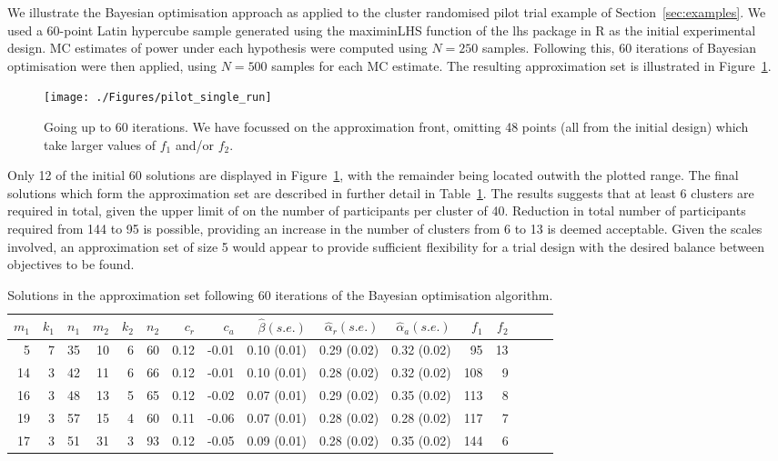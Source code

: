 \documentclass{article} %
\begin{document}
We illustrate the Bayesian optimisation approach as applied to the cluster randomised pilot trial example of  Section~\ref{sec:examples}. We used a 60-point Latin hypercube sample generated using the maximinLHS function of the lhs package in R as the initial experimental design. MC estimates of power under each hypothesis were computed using $N = 250$ samples. Following this, 60 iterations of Bayesian optimisation were then applied, using $N = 500$ samples for each MC estimate. The resulting approximation set is illustrated in Figure~\ref{fig:pilot_single_run}.

\begin{figure}
\centering
\texttt{[image: ./Figures/pilot\_single\_run]}
\caption{Going up to 60 iterations. We have focussed on the approximation front, omitting 48 points (all from the initial design) which take larger values of $f_{1}$ and/or $f_{2}$. }
\label{fig:pilot_single_run}
\end{figure}

Only 12 of the initial 60 solutions are displayed in Figure~\ref{fig:pilot_single_run}, with the remainder being located outwith the plotted range. The final solutions which form the approximation set are described in further detail in Table~\ref{tab:pilot_single_run}. The results suggests that at least 6 clusters are required in total, given the upper limit of on the number of participants per cluster of 40. Reduction in total number of participants required from 144 to 95 is possible, providing an increase in the number of clusters from 6 to 13 is deemed acceptable. Given the scales involved, an approximation set of size 5 would appear to provide sufficient flexibility for a trial design with the desired balance between objectives to be found.

\begin{table}
\centering
\begin{tabular}{rrrrrrrrrrrrrrrr}
\toprule 
$m_{1}$ & $k_{1}$ & $n_{1}$ & $m_{2}$ & $k_{2}$ & $n_{2}$ & $c_{r}$ & $c_{a}$ & $\hat{\beta} (s.e.)$ & $\hat{\alpha}_{r} (s.e.)$ & 
$\hat{\alpha}_{a} (s.e.)$ & $f_{1}$ & $f_{2}$ \\
\midrule
5 & 7 & 35 & 10 & 6 & 60 & 0.12 & -0.01 & 0.10 (0.01) & 0.29 (0.02) & 0.32 (0.02) & 95 & 13 \\ 
14 & 3 & 42 & 11 & 6 & 66 & 0.12 & -0.01 & 0.10 (0.01) & 0.28 (0.02) & 0.32 (0.02) & 108 & 9 \\ 
16 & 3 & 48 & 13 & 5 & 65 & 0.12 & -0.02 & 0.07 (0.01) & 0.29 (0.02) & 0.35 (0.02) & 113 & 8 \\ 
19 & 3 & 57 & 15 & 4 & 60 & 0.11 & -0.06 & 0.07 (0.01) & 0.28 (0.02) & 0.28 (0.02) & 117 & 7 \\
17 & 3 & 51 & 31 & 3 & 93 & 0.12 & -0.05 & 0.09 (0.01) & 0.28 (0.02) & 0.35 (0.02) & 144 & 6 \\ 
\bottomrule
\end{tabular}
\caption{Solutions in the approximation set following 60 iterations of the Bayesian optimisation algorithm.} 
\label{tab:pilot_single_run}
\end{table}
\end{document}
